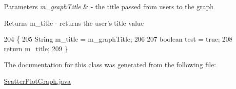 \begin{DoxyParams}{Parameters}
{\em m\-\_\-graph\-Title} & -\/ the title passed from users to the graph \\
\hline
\end{DoxyParams}
\begin{DoxyReturn}{Returns}
m\-\_\-title -\/ returns the user's title value 
\end{DoxyReturn}

\begin{DoxyCode}
204                                                   \{
205         String m\_title = m\_graphTitle;
206         
207         \textcolor{keywordtype}{boolean} test = \textcolor{keyword}{true};
208         \textcolor{keywordflow}{return} m\_title;
209     \} 
\end{DoxyCode}


The documentation for this class was generated from the following file\-:\begin{DoxyCompactItemize}
\item 
\hyperlink{_scatter_plot_graph_8java}{Scatter\-Plot\-Graph.\-java}\end{DoxyCompactItemize}
